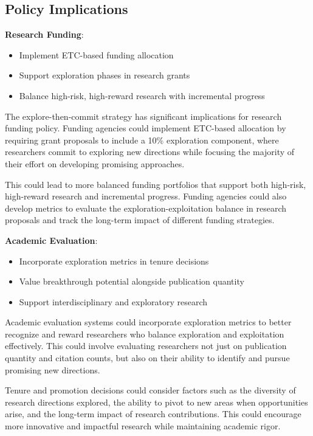 \documentclass[letterpaper]{article} %
\begin{document}
{{{{{{{{{\subsection{Policy Implications}

\textbf{Research Funding}:
\begin{itemize}
\item Implement ETC-based funding allocation
\item Support exploration phases in research grants
\item Balance high-risk, high-reward research with incremental progress
\end{itemize}

The explore-then-commit strategy has significant implications for research funding policy. Funding agencies could implement ETC-based allocation by requiring grant proposals to include a 10\% exploration component, where researchers commit to exploring new directions while focusing the majority of their effort on developing promising approaches.

This could lead to more balanced funding portfolios that support both high-risk, high-reward research and incremental progress. Funding agencies could also develop metrics to evaluate the exploration-exploitation balance in research proposals and track the long-term impact of different funding strategies.

\textbf{Academic Evaluation}:
\begin{itemize}
\item Incorporate exploration metrics in tenure decisions
\item Value breakthrough potential alongside publication quantity
\item Support interdisciplinary and exploratory research
\end{itemize}

Academic evaluation systems could incorporate exploration metrics to better recognize and reward researchers who balance exploration and exploitation effectively. This could involve evaluating researchers not just on publication quantity and citation counts, but also on their ability to identify and pursue promising new directions.

Tenure and promotion decisions could consider factors such as the diversity of research directions explored, the ability to pivot to new areas when opportunities arise, and the long-term impact of research contributions. This could encourage more innovative and impactful research while maintaining academic rigor.

}}}}}}}}}
\end{document}
